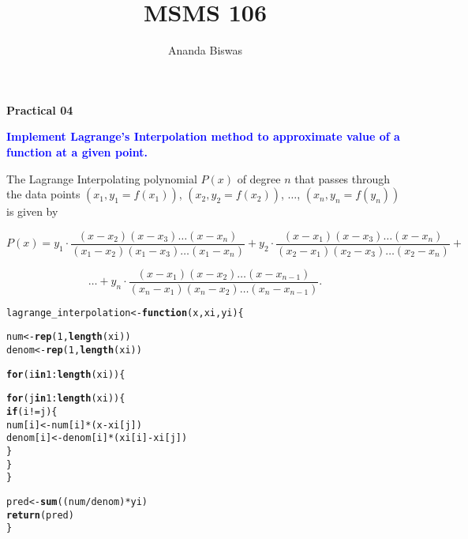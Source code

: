 \documentclass[11pt, a4paper]{article}\usepackage[]{graphicx}\usepackage[]{xcolor}
\title{MSMS 106}
\author{Ananda Biswas}
\date{}
\makeatletter
\newcommand{\hlnum}[1]{\textcolor[rgb]{0.686,0.059,0.569}{#1}}%
\newcommand{\hlopt}[1]{\textcolor[rgb]{0,0,0}{#1}}%
\newcommand{\hldef}[1]{\textcolor[rgb]{0.345,0.345,0.345}{#1}}%
\newcommand{\hlkwa}[1]{\textcolor[rgb]{0.161,0.373,0.58}{\textbf{#1}}}%
\newcommand{\hlkwb}[1]{\textcolor[rgb]{0.69,0.353,0.396}{#1}}%
\newcommand{\hlkwc}[1]{\textcolor[rgb]{0.333,0.667,0.333}{#1}}%
\newcommand{\hlkwd}[1]{\textcolor[rgb]{0.737,0.353,0.396}{\textbf{#1}}}%
\newenvironment{kframe}{%
 \def\at@end@of@kframe{}%
 \ifinner\ifhmode%
  \def\at@end@of@kframe{\end{minipage}}%
  \begin{minipage}{\columnwidth}%
 \fi\fi%
 \def\FrameCommand##1{\hskip\@totalleftmargin \hskip-\fboxsep
 \colorbox{shadecolor}{##1}\hskip-\fboxsep
     \hskip-\linewidth \hskip-\@totalleftmargin \hskip\columnwidth}%
 \MakeFramed {\advance\hsize-\width
   \@totalleftmargin\z@ \linewidth\hsize
   \@setminipage}}%
 {\par\unskip\endMakeFramed%
 \at@end@of@kframe}
\newenvironment{knitrout}{}{} %
\makeatother
\begin{document}
\maketitle

\begin{center}
\textbf{Practical 04}
\end{center}

\smallpencil \hspace{0.5cm} \textcolor{blue}{\textbf{Implement Lagrange's Interpolation method to approximate value of a function at a given point.}}

\vspace{0.5cm}

\faArrowAltCircleRight[regular] \hspace{0.5cm} The Lagrange Interpolating polynomial $P(x)$ of degree $n$ that passes through the data points $(x_1, y_1 = f(x_1))$, $(x_2, y_2 = f(x_2))$, $\ldots$, $(x_n, y_n = f(y_n))$ is given by

$$P(x) = y_1 \cdot \dfrac{(x - x_2)(x - x_3) \ldots (x - x_n)}{(x_1 - x_2) (x_1 - x_3) \ldots (x_1 - x_n)} + y_2 \cdot \dfrac{(x - x_1)(x - x_3) \ldots (x - x_n)}{(x_2 - x_1) (x_2 - x_3) \ldots (x_2 - x_n)} + $$

$$ \ldots + y_n \cdot \dfrac{(x - x_1)(x - x_2) \ldots (x - x_{n-1})}{(x_n - x_1) (x_n - x_2) \ldots (x_n - x_{n-1})}.$$

\vspace{1cm}

\begin{knitrout}
\color{fgcolor}\begin{kframe}
\begin{alltt}
\hldef{lagrange_interpolation} \hlkwb{<-} \hlkwa{function}\hldef{(}\hlkwc{x}\hldef{,} \hlkwc{xi}\hldef{,} \hlkwc{yi}\hldef{)\{}

  \hldef{num} \hlkwb{<-} \hlkwd{rep}\hldef{(}\hlnum{1}\hldef{,} \hlkwd{length}\hldef{(xi))}
  \hldef{denom} \hlkwb{<-} \hlkwd{rep}\hldef{(}\hlnum{1}\hldef{,} \hlkwd{length}\hldef{(xi))}

  \hlkwa{for} \hldef{(i} \hlkwa{in} \hlnum{1}\hlopt{:}\hlkwd{length}\hldef{(xi)) \{}

    \hlkwa{for} \hldef{(j} \hlkwa{in} \hlnum{1}\hlopt{:}\hlkwd{length}\hldef{(xi)) \{}
      \hlkwa{if}\hldef{(i} \hlopt{!=} \hldef{j)\{}
        \hldef{num[i]} \hlkwb{<-} \hldef{num[i]} \hlopt{*} \hldef{(x} \hlopt{-} \hldef{xi[j])}
        \hldef{denom[i]} \hlkwb{<-} \hldef{denom[i]} \hlopt{*} \hldef{(xi[i]} \hlopt{-} \hldef{xi[j])}
      \hldef{\}}
    \hldef{\}}
  \hldef{\}}

  \hldef{pred} \hlkwb{<-} \hlkwd{sum}\hldef{((num} \hlopt{/} \hldef{denom)} \hlopt{*} \hldef{yi)}
  \hlkwd{return}\hldef{(pred)}
\hldef{\}}
\end{alltt}
\end{kframe}
\end{knitrout}
\end{document}
